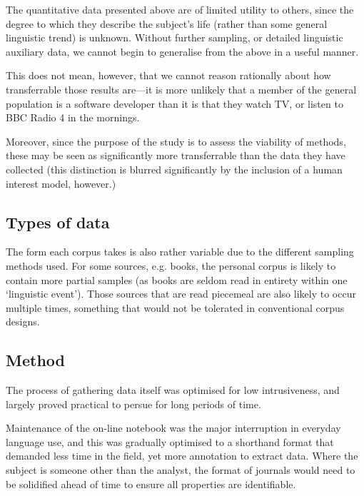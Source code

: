 

The quantitative data presented above are of limited utility to others, since the degree to which they describe the subject's life (rather than some general linguistic trend) is unknown.  Without further sampling, or detailed linguistic auxiliary data, we cannot begin to generalise from the above in a useful manner.

This does not mean, however, that we cannot reason rationally about how transferrable those results are---it is more unlikely that a member of the general population is a software developer than it is that they watch TV, or listen to BBC Radio 4 in the mornings.

Moreover, since the purpose of the study is to assess the viability of methods, these may be seen as significantly more transferrable than the data they have collected (this distinction is blurred significantly by the inclusion of a human interest model, however.)




\subsection{Types of data}
The form each corpus takes is also rather variable due to the different sampling methods used.  For some sources, e.g. books, the personal corpus is likely to contain more partial samples (as books are seldom read in entirety within one `linguistic event').  Those sources that are read piecemeal are also likely to occur multiple times, something that would not be tolerated in conventional corpus designs.




\subsection{Method}
The process of gathering data itself was optimised for low intrusiveness, and largely proved practical to persue for long periods of time.

Maintenance of the on-line notebook was the major interruption in everyday language use, and this was gradually optimised to a shorthand format that demanded less time in the field, yet more annotation to extract data.  Where the subject is someone other than the analyst, the format of journals would need to be solidified ahead of time to ensure all properties are identifiable.

